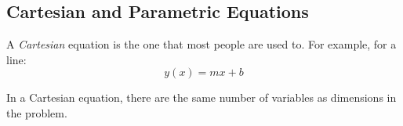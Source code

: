\subsection{Cartesian and Parametric Equations}\label{subsec:Cartesian_Parametric}
\begin{definition}[Cartesian]\label{def:Cartesian}
  A \emph{Cartesian} equation is the one that most people are used to.
  For example, for a line:
  \begin{equation}\label{eq:Generic_Cartesian_Line}
    y(x) = mx + b
  \end{equation}

  In a Cartesian equation, there are the same number of variables as dimensions in the problem.
\end{definition}


